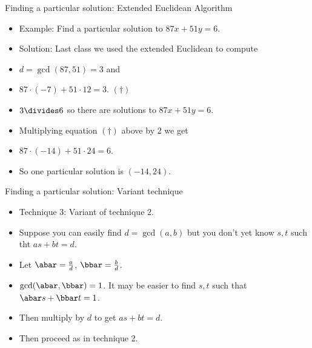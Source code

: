 \documentclass{beamer}
\begin{document}
\begin{frame}{Finding a particular solution: Extended Euclidean Algorithm}

\begin{itemize}
  \item Example: Find a particular solution to $87x + 51y = 6$.
  \item Solution: Last class we used the extended Euclidean to compute
  \item $d=\gcd(87, 51) = 3$ and
  \item $87\cdot (-7) + 51 \cdot 12 = 3$. \quad $(\dagger)$
  \item $3\divides 6$ so there are solutions to $87x + 51y = 6$.
  \item Multiplying equation $(\dagger)$ above by 2 we get
  \item $87\cdot (-14) + 51 \cdot 24 = 6$.
  \item So one particular solution is $(-14, 24)$.
\end{itemize}

\end{frame}


\begin{frame}{Finding a particular solution: Variant technique}
\begin{itemize}
  \item Technique 3: Variant of technique 2.
  \item Suppose you can easily find $d=\gcd(a,b)$ but you don't yet know $s,t$
  such tht $as + bt = d$.
  \item Let $\abar=\frac{a}{d}$, $\bbar=\frac{b}{d}$.
  \item $\gcd(\abar,\bbar)=1$. It may be easier to find $s,t$ such that $\abar s + \bbar t = 1$.
  \item Then multiply by $d$ to get $a s + b t = d$.
  \item Then proceed as in technique 2.
\end{itemize}

\end{frame}

\end{document}
